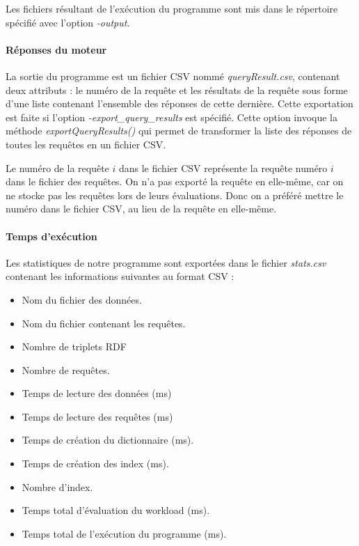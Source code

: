 \documentclass[12pt,titlepage]{article}
\begin{document}
Les fichiers résultant de l'exécution du programme sont mis dans le répertoire spécifié avec l'option \textit{-output}.

\paragraph{Réponses du moteur}

La sortie du programme est un fichier CSV nommé \textit{queryResult.csv}, contenant deux attributs : le numéro de la requête et les résultats de la requête sous forme d'une liste contenant l'ensemble des réponses de cette dernière.
Cette exportation est faite si l'option \textit{-export\_query\_results} est spécifié. Cette option invoque la méthode \textit{exportQueryResults()} qui permet de transformer la liste des réponses de toutes les requêtes en un fichier CSV.

Le numéro de la requête $i$ dans le fichier CSV représente la requête numéro $i$ dans le fichier des requêtes. On n'a pas exporté la requête en elle-même, car on ne stocke pas les requêtes lors de leurs évaluations. Donc on a préféré mettre le numéro dans le fichier CSV, au lieu de la requête en elle-même.

\paragraph{Temps d'exécution}

Les statistiques de notre programme sont exportées dans le fichier \textit{stats.csv} contenant les informations suivantes au format CSV : 

\begin{itemize}
  \item Nom du fichier des données.
  \item Nom du fichier contenant les requêtes.
  \item Nombre de triplets RDF
  \item Nombre de requêtes.
  \item Temps de lecture des données (ms) 
  \item Temps de lecture des requêtes (ms)
  \item Temps de création du dictionnaire (ms).
  \item Temps de création des index (ms). 
  \item Nombre d'index.
  \item Temps total d'évaluation du workload (ms). 
  \item Temps total de l'exécution du programme (ms).

\end{itemize}
\end{document}
